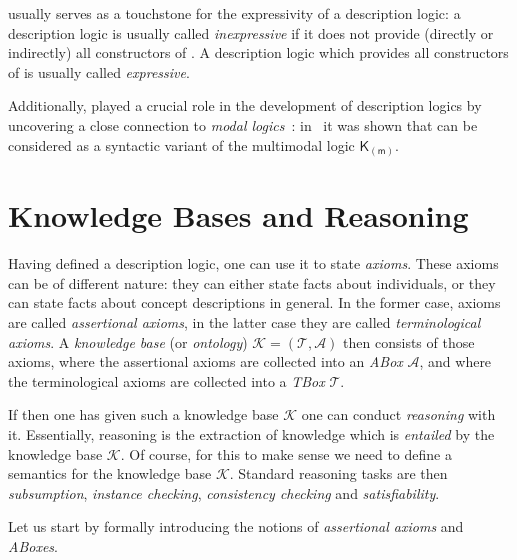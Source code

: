 \ALC usually serves as a touchstone for the expressivity of a description logic: a
description logic is usually called \emph{inexpressive} if it does not provide (directly
or indirectly) all constructors of \ALC.  A description logic which provides all
constructors of \ALC is usually called \emph{expressive}.

Additionally, \ALC played a crucial role in the development of description logics by
uncovering a close connection to \emph{modal
  logics}~\cite{MLhandbook,BaaderLutz-MLhandbook-06}: in~\cite{DBLP:conf/ijcai/Schild91}
it was shown that \ALC can be considered as a syntactic variant of the multimodal logic
$\mathsf{K}_{(\mathsf{m})}$.

\section{Knowledge Bases and Reasoning}
\label{sec:knowledge-bases}

Having defined a description logic, one can use it to state \emph{axioms}.  These axioms
can be of different nature: they can either state facts about individuals, or they can
state facts about concept descriptions in general.  In the former case, axioms are called
\emph{assertional axioms}, in the latter case they are called \emph{terminological
  axioms}.  A \emph{knowledge base} (or \emph{ontology}) $\mathcal{K} = (\mathcal{T},
\mathcal{A})$ then consists of those axioms, where the assertional axioms are collected
into an \emph{ABox} $\mathcal{A}$, and where the terminological axioms are collected into
a \emph{TBox} $\mathcal{T}$.

If then one has given such a knowledge base $\mathcal{K}$ one can conduct \emph{reasoning}
with it.  Essentially, reasoning is the extraction of knowledge which is \emph{entailed}
by the knowledge base $\mathcal{K}$.  Of course, for this to make sense we need to define
a semantics for the knowledge base $\mathcal{K}$.  Standard reasoning tasks are then
\emph{subsumption}, \emph{instance checking}, \emph{consistency checking} and
\emph{satisfiability}.

Let us start by formally introducing the notions of \emph{assertional axioms} and
\emph{ABoxes}.

